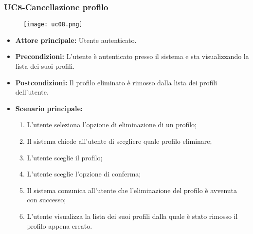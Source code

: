 \pagebreak
\subsubsection{UC8-Cancellazione profilo}
\begin{figure}[h] \texttt{[image: uc08.png]} \end{figure}
\begin{itemize}
\item \textbf{Attore principale:} Utente autenticato.
\item \textbf{Precondizioni:} L'utente è autenticato presso il sistema e sta visualizzando la lista dei suoi profili.
\item \textbf{Postcondizioni:} Il profilo eliminato è rimosso dalla lista dei profili dell'utente.
\item \textbf{Scenario principale:}
\begin{enumerate}
    \item L'utente seleziona l'opzione di eliminazione di un profilo;
    \item Il sistema chiede all'utente di scegliere quale profilo eliminare;
    \item L'utente sceglie il profilo;
    \item L'utente sceglie l'opzione di conferma;
    \item Il sistema comunica all'utente che l'eliminazione del profilo è avvenuta con successo;
    \item L'utente visualizza la lista dei suoi profili dalla quale è stato rimosso il profilo appena creato.
\end{enumerate}
\end{itemize}

